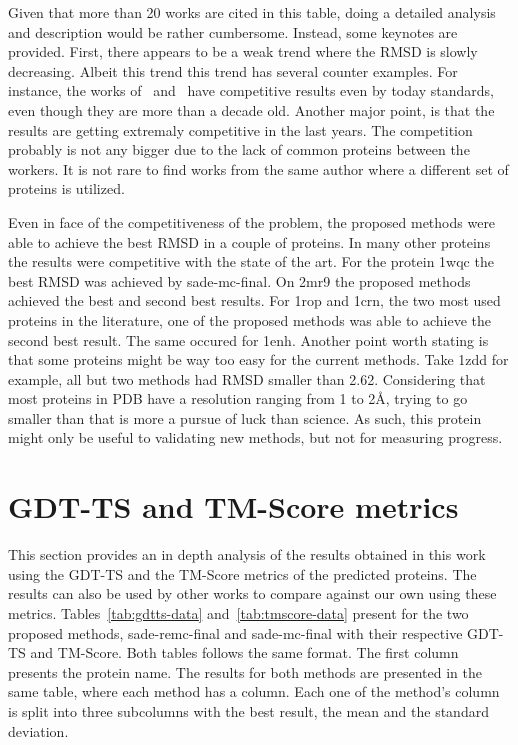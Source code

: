 Given that more than 20 works are cited in this table, doing a detailed
analysis and description would be rather cumbersome. Instead, some keynotes are
provided. First, there appears to be a weak trend where the RMSD is slowly
decreasing. Albeit this trend this trend has several counter examples.
For instance, the works of~\cite{cazacu2014steel} and~\cite{judy2009multi}
have competitive results even by today standards, even though they are more than
a decade old. Another major point, is that the results are getting extremaly
competitive in the last years. The competition probably is not any bigger due to
the lack of common proteins between the workers. It is not rare to find works
from the same author where a different set of proteins is utilized.

Even in face of the competitiveness of the problem, the proposed methods were
able to achieve the best RMSD in a couple of proteins. In many other proteins
the results were competitive with the state of the art. For the protein 1wqc
the best RMSD was achieved by sade-mc-final. On 2mr9 the proposed methods
achieved the best and second best results. For 1rop and 1crn, the two most used
proteins in the literature, one of the proposed methods was able to achieve
the second best result. The same occured for 1enh. Another point worth stating
is that some proteins might be way too easy for the current methods. Take 1zdd
for example, all but two methods had RMSD smaller than 2.62. Considering that
most proteins in PDB have a resolution ranging from 1 to 2\AA, trying to go
smaller than that is more a pursue of luck than science. As such, this protein
might only be useful to validating new methods, but not for measuring progress.

\section{GDT-TS and TM-Score metrics}

This section provides an in depth analysis of the results obtained in this
work using the GDT-TS and the TM-Score metrics of the predicted proteins. The
results can also be used by other works to compare against our own using
these metrics. Tables~\ref{tab:gdtts-data} and~\ref{tab:tmscore-data} present
for the two proposed methods, sade-remc-final and sade-mc-final with their
respective GDT-TS and TM-Score. Both tables follows the same format. The
first column presents the protein name. The results for both methods are
presented in the same table, where each method has a column. Each one of the
method's column is split into three subcolumns with the best result, the mean
and the standard deviation.

